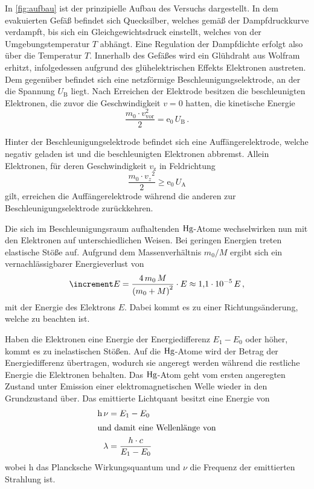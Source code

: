 In \autoref{fig:aufbau} ist der prinzipielle Aufbau des Versuchs dargestellt.
In dem evakuierten Gefäß befindet sich Quecksilber, welches gemäß der Dampfdruckkurve verdampft,
bis sich ein Gleichgewichtsdruck einstellt, welches von der Umgebungstemperatur $T$ abhängt.
Eine Regulation der Dampfdichte erfolgt also über die Temperatur $T$.
Innerhalb des Gefäßes wird ein Glühdraht aus Wolfram erhitzt, 
infolgedessen aufgrund des glühelektrischen Effekts Elektronen austreten.
Dem gegenüber befindet sich eine netzförmige Beschleunigungselektrode, an der die Spannung $U_\text{B}$ liegt.
Nach Erreichen der Elektrode besitzen die beschleunigten Elektronen, die zuvor die Geschwindigkeit $v = 0$ hatten, die kinetische Energie
\begin{equation}
    \frac{m_{0} \cdot v_{\mathrm{vor}}^{2}}{2} = \mathrm{e}_{0} \, U_{\mathrm{B}} \, .
\end{equation}

Hinter der Beschleunigungselektrode befindet sich eine Auffängerelektrode, 
welche negativ geladen ist und die beschleunigten Elektronen abbremst.
Allein Elektronen, für deren Geschwindigkeit $v_\text{z}$ in Feldrichtung
\begin{equation}
    \frac{m_{0} \cdot v_{z}{ }^{2}}{2}  \geq \mathrm{e}_{0} \, U_{\mathrm{A}}
\end{equation}
gilt, erreichen die Auffängerelektrode während die anderen zur Beschleunigungselektrode zurückkehren.

Die sich im Beschleunigungsraum aufhaltenden $\ce{Hg}$-Atome wechselwirken nun mit den Elektronen auf unterschiedlichen Weisen.
Bei geringen Energien treten elastische Stöße auf. 
Aufgrund dem Massenverhältnis $m_0/M$ ergibt sich ein vernachlässigbarer Energieverlust von
\begin{equation}
    \increment E=\frac{4 \, m_{0} \, M}{\left(m_{0}+M\right)^{2}} \cdot E \approx \num{1.1e{-5}} \, E \, ,
\end{equation}
mit der Energie des Elektrons $E$. 
Dabei kommt es zu einer Richtungsänderung, welche zu beachten ist.

Haben die Elektronen eine Energie der Energiedifferenz $E_1 - E_0$ oder höher, kommt es zu inelastischen Stößen.
Auf die $\ce{Hg}$-Atome wird der Betrag der Energiedifferenz übertragen, wodurch sie angeregt werden während die restliche Energie die Elektronen behalten. 
Das $\ce{Hg}$-Atom geht vom ersten angeregten Zustand unter Emission einer elektromagnetischen Welle wieder in den Grundzustand über. 
Das emittierte Lichtquant besitzt eine Energie von
\begin{align}
    \text{h} \, \nu &= E_1 - E_0 \\
    \intertext{und damit eine Wellenlänge von}
    \lambda &= \frac{h \cdot c}{E_1 - E_0} \label{eq:lambda}
\end{align}
wobei h das Plancksche Wirkungsquantum und $\nu$ die Frequenz der emittierten Strahlung ist.


